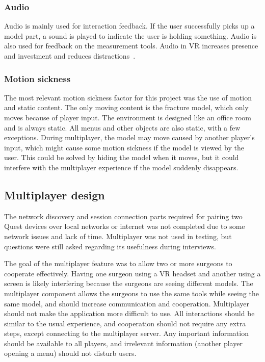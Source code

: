 \documentclass[a4paper]{report}
\begin{document}
\subsubsection{Audio}
Audio is mainly used for interaction feedback. If the user successfully picks up a model part, a sound is played to indicate the user is holding something. Audio is also used for feedback on the measurement tools. Audio in VR increases presence and investment and reduces distractions~\cite{kern_audio_2020}.

\subsubsection{Motion sickness}
The most relevant motion sickness factor for this project was the use of motion and static content. The only moving content is the fracture model, which only moves because of player input. The environment is designed like an office room and is always static. All menus and other objects are also static, with a few exceptions.
During multiplayer, the model may move caused by another player's input, which might cause some motion sickness if the model is viewed by the user. This could be solved by hiding the model when it moves, but it could interfere with the multiplayer experience if the model suddenly disappears.

\subsection{Multiplayer design}
The network discovery and session connection parts required for pairing two Quest devices over local networks or internet was not completed due to some network issues and lack of time. Multiplayer was not used in testing, but questions were still asked regarding its usefulness during interviews.

The goal of the multiplayer feature was to allow two or more surgeons to cooperate effectively. Having one surgeon using a VR headset and another using a screen is likely interfering because the surgeons are seeing different models. The multiplayer component allows the surgeons to use the same tools while seeing the same model, and should increase communication and cooperation.
Multiplayer should not make the application more difficult to use. All interactions should be similar to the usual experience, and cooperation should not require any extra steps, except connecting to the multiplayer server. Any important information should be available to all players, and irrelevant information (another player opening a menu) should not disturb users.
\end{document}
